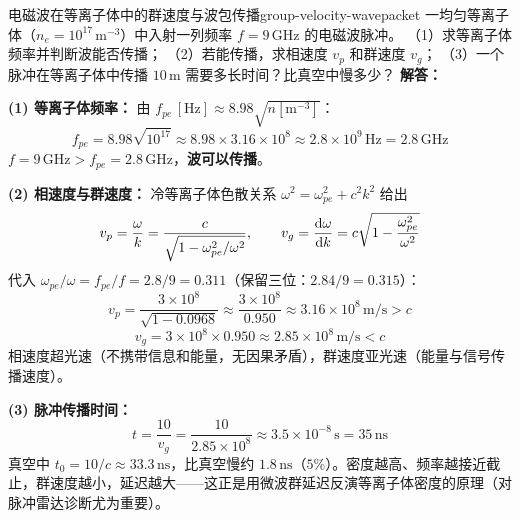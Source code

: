 \begin{example}{电磁波在等离子体中的群速度与波包传播}{group-velocity-wavepacket}
一均匀等离子体（$n_e = 10^{17}\,\mathrm{m^{-3}}$）中入射一列频率 $f = 9\,\mathrm{GHz}$ 的电磁波脉冲。
（1）求等离子体频率并判断波能否传播；
（2）若能传播，求相速度 $v_p$ 和群速度 $v_g$；
（3）一个脉冲在等离子体中传播 $10\,\mathrm{m}$ 需要多长时间？比真空中慢多少？
\tcblower
\textbf{解答：}

\textbf{(1) 等离子体频率：} 由 $f_{pe}\,[\mathrm{Hz}] \approx 8.98\sqrt{n[\mathrm{m^{-3}}]}$：
\[
f_{pe} = 8.98\sqrt{10^{17}} \approx 8.98\times3.16\times10^8 \approx 2.8\times10^9\,\mathrm{Hz} = 2.8\,\mathrm{GHz}
\]
$f = 9\,\mathrm{GHz} > f_{pe} = 2.8\,\mathrm{GHz}$，\textbf{波可以传播}。

\textbf{(2) 相速度与群速度：} 冷等离子体色散关系 $\omega^2 = \omega_{pe}^2 + c^2k^2$ 给出
\[
v_p = \frac{\omega}{k} = \frac{c}{\sqrt{1-\omega_{pe}^2/\omega^2}}, \qquad v_g = \frac{\mathrm{d}\omega}{\mathrm{d} k} = c\sqrt{1-\frac{\omega_{pe}^2}{\omega^2}}
\]
代入 $\omega_{pe}/\omega = f_{pe}/f = 2.8/9 = 0.311$（保留三位：$2.84/9 = 0.315$）：
\[
v_p = \frac{3\times10^8}{\sqrt{1-0.0968}} \approx \frac{3\times10^8}{0.950} \approx 3.16\times10^8\,\mathrm{m/s} > c
\]
\[
v_g = 3\times10^8\times0.950 \approx 2.85\times10^8\,\mathrm{m/s} < c
\]
相速度超光速（不携带信息和能量，无因果矛盾），群速度亚光速（能量与信号传播速度）。

\textbf{(3) 脉冲传播时间：}
\[
t = \frac{10}{v_g} = \frac{10}{2.85\times10^8} \approx 3.5\times10^{-8}\,\mathrm{s} = 35\,\mathrm{ns}
\]
真空中 $t_0 = 10/c \approx 33.3\,\mathrm{ns}$，比真空慢约 $1.8\,\mathrm{ns}$（$5\%$）。密度越高、频率越接近截止，群速度越小，延迟越大——这正是用微波群延迟反演等离子体密度的原理（对脉冲雷达诊断尤为重要）。
\end{example}

